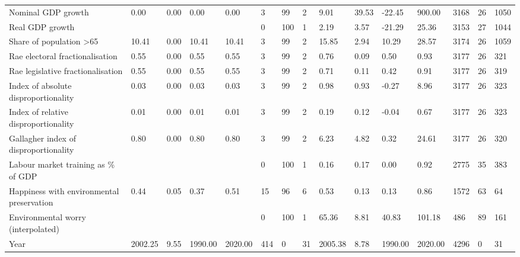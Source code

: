 \begin{longtable}{lllllllllllllll}
Nominal GDP growth & 0.00 & 0.00 & 0.00 & 0.00 & 3 & 99 & 2 & 9.01 & 39.53 & -22.45 & 900.00 & 3168 & 26 & 1050\\
Real GDP growth &  &  &  &  & 0 & 100 & 1 & 2.19 & 3.57 & -21.29 & 25.36 & 3153 & 27 & 1044\\
Share of population >65 & 10.41 & 0.00 & 10.41 & 10.41 & 3 & 99 & 2 & 15.85 & 2.94 & 10.29 & 28.57 & 3174 & 26 & 1059\\
\addlinespace
Rae electoral fractionalisation & 0.55 & 0.00 & 0.55 & 0.55 & 3 & 99 & 2 & 0.76 & 0.09 & 0.50 & 0.93 & 3177 & 26 & 321\\
Rae legislative fractionalisation & 0.55 & 0.00 & 0.55 & 0.55 & 3 & 99 & 2 & 0.71 & 0.11 & 0.42 & 0.91 & 3177 & 26 & 319\\
Index of absolute disproportionality & 0.03 & 0.00 & 0.03 & 0.03 & 3 & 99 & 2 & 0.98 & 0.93 & -0.27 & 8.96 & 3177 & 26 & 323\\
Index of relative disproportionality & 0.01 & 0.00 & 0.01 & 0.01 & 3 & 99 & 2 & 0.19 & 0.12 & -0.04 & 0.67 & 3177 & 26 & 323\\
Gallagher index of disproportionality & 0.80 & 0.00 & 0.80 & 0.80 & 3 & 99 & 2 & 6.23 & 4.82 & 0.32 & 24.61 & 3177 & 26 & 320\\
\addlinespace
Labour market training as \% of GDP &  &  &  &  & 0 & 100 & 1 & 0.16 & 0.17 & 0.00 & 0.92 & 2775 & 35 & 383\\
Happiness with environmental preservation & 0.44 & 0.05 & 0.37 & 0.51 & 15 & 96 & 6 & 0.53 & 0.13 & 0.13 & 0.86 & 1572 & 63 & 64\\
Environmental worry (interpolated) &  &  &  &  & 0 & 100 & 1 & 65.36 & 8.81 & 40.83 & 101.18 & 486 & 89 & 161\\
Year & 2002.25 & 9.55 & 1990.00 & 2020.00 & 414 & 0 & 31 & 2005.38 & 8.78 & 1990.00 & 2020.00 & 4296 & 0 & 31\\
\bottomrule
\end{longtable}
